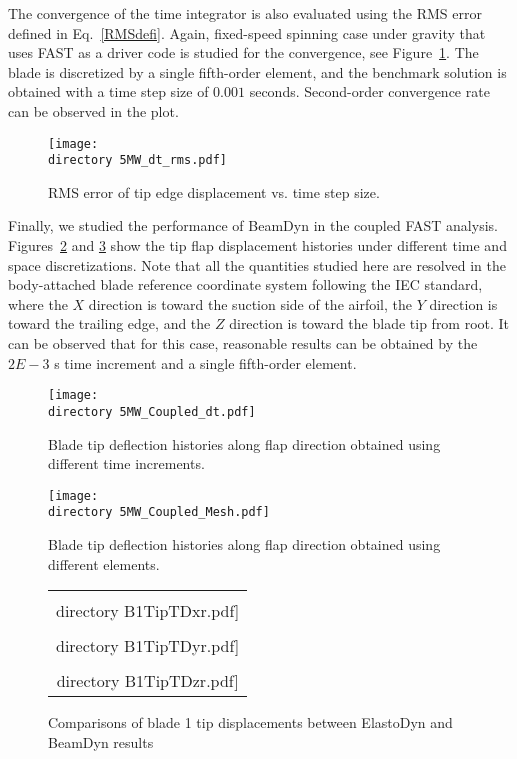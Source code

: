 \documentclass{aiaa-tc}
\def\directory{EPSF/}
\begin{document}
The convergence of the time integrator is also evaluated using the RMS error defined in Eq.~\eqref{RMSdefi}. Again, fixed-speed spinning case under gravity that uses FAST as a driver code is studied for the convergence, see Figure~\ref{fig:5MWdt_rms}. The blade is discretized by a single fifth-order element, and the benchmark solution is obtained  with a time step size of $0.001$ seconds. Second-order convergence rate can be observed in the plot.

\begin{figure}
    \centering
\texttt{[image: \\directory  5MW\_dt\_rms.pdf]}
\caption{RMS error of tip edge displacement vs. time step size.}
\label{fig:5MWdt_rms}
\end{figure} 

Finally, we studied the performance of BeamDyn in the coupled FAST analysis. Figures~\ref{fig:5MW_Coupled_dt} and \ref{fig:5MW_Coupled_Mesh} show the tip flap displacement histories under different time and space discretizations. Note that all the quantities studied here are resolved in the body-attached blade reference coordinate system following the IEC standard, where the $X$ direction is toward the suction side of the airfoil, the $Y$ direction is toward the trailing edge, and the $Z$ direction is toward the blade tip from root. It can be observed that for this case, reasonable results can be obtained by the $2E-3$ s time increment and a single fifth-order element.  

\begin{figure}
    \centering
\texttt{[image: \\directory  5MW\_Coupled\_dt.pdf]}
\caption{Blade tip deflection histories along flap direction obtained using different time increments.}
\label{fig:5MW_Coupled_dt}
\end{figure} 

\begin{figure}
    \centering
\texttt{[image: \\directory  5MW\_Coupled\_Mesh.pdf]}
\caption{Blade tip deflection histories along flap direction obtained using different elements.}
\label{fig:5MW_Coupled_Mesh}
\end{figure} 

\begin{figure}
    \centering
    \begin{tabular}{c}
    \subfloat[Flap Displacement]{\label{fig:5MWTipX}\texttt{[image: \\directory  B1TipTDxr.pdf]}} \\
\subfloat[Edge Displacement]{\label{fig:5MWTipY}\texttt{[image: \\directory  B1TipTDyr.pdf]}}\\
\subfloat[Axial Displacement]{\label{fig:5MWTipZ}\texttt{[image: \\directory  B1TipTDzr.pdf]}}\\
\end{tabular}
\caption{Comparisons of blade 1 tip displacements between ElastoDyn and BeamDyn results}
\label{fig:5MWTip}
\end{figure}  
\end{document}
